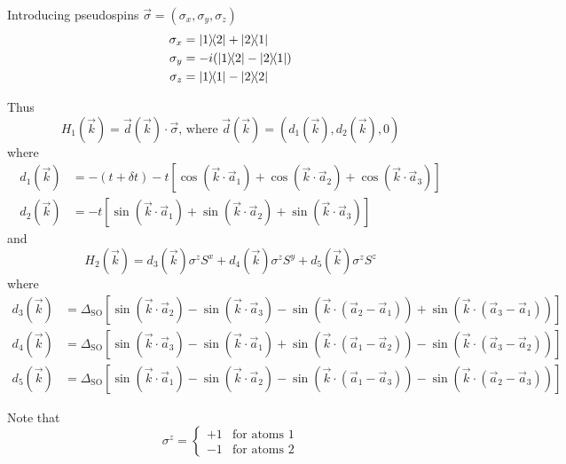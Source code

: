 \documentclass[12pt,a4paper,titlepage]{article}
\newcommand{\trm}[1]{\textrm{#1}} %
\begin{document}
Introducing pseudospins $\vec{\sigma}=(\sigma_{x},\sigma_{y},\sigma_{z})$
\begin{equation}
\begin{aligned}
\sigma_{x}&=\ketbra{1}{2}+\ketbra{2}{1}\\
\sigma_{y}&=-i(\ketbra{1}{2}-\ketbra{2}{1})\\
\sigma_{z}&=\ketbra{1}{1}-\ketbra{2}{2}
\end{aligned}
\end{equation}

Thus
\begin{equation}
H_{1}(\vec{k})=\vec{d}(\vec{k})\cdot\vec{\sigma}{\trm{, where }}\vec{d}(\vec{k})=(d_{1}(\vec{k}),d_{2}(\vec{k}),0)
\end{equation}
where
\begin{equation}
\begin{aligned}
d_{1}(\vec{k})&=-(t+\delta t)-t\left[\cos(\vec{k}\cdot\vec{a}_{1})+\cos(\vec{k}\cdot\vec{a}_{2})+\cos(\vec{k}\cdot\vec{a}_{3})\right]\\
d_{2}(\vec{k})&=-t\left[\sin(\vec{k}\cdot\vec{a}_{1})+\sin(\vec{k}\cdot\vec{a}_{2})+\sin(\vec{k}\cdot\vec{a}_{3})\right]
\end{aligned}
\end{equation}
and
\begin{equation}
H_{2}(\vec{k})=d_{3}(\vec{k})\sigma^{z}S^{x}+d_{4}(\vec{k})\sigma^{z}S^{y}+d_{5}(\vec{k})\sigma^{z}S^{z}
\end{equation}
where
\begin{equation}
\begin{aligned}
d_{3}(\vec{k})&=\Delta_{\trm{SO}}\left[\sin(\vec{k}\cdot\vec{a}_{2})-\sin(\vec{k}\cdot\vec{a}_{3})-\sin(\vec{k}\cdot(\vec{a}_{2}-\vec{a}_{1}))+\sin(\vec{k}\cdot(\vec{a}_{3}-\vec{a}_{1}))\right]\\
d_{4}(\vec{k})&=\Delta_{\trm{SO}}\left[\sin(\vec{k}\cdot\vec{a}_{3})-\sin(\vec{k}\cdot\vec{a}_{1})+\sin(\vec{k}\cdot(\vec{a}_{1}-\vec{a}_{2}))-\sin(\vec{k}\cdot(\vec{a}_{3}-\vec{a}_{2}))\right]\\
d_{5}(\vec{k})&=\Delta_{\trm{SO}}\left[\sin(\vec{k}\cdot\vec{a}_{1})-\sin(\vec{k}\cdot\vec{a}_{2})-\sin(\vec{k}\cdot(\vec{a}_{1}-\vec{a}_{3}))-\sin(\vec{k}\cdot(\vec{a}_{2}-\vec{a}_{3}))\right]
\end{aligned}
\end{equation}

Note that
\begin{equation}
\sigma^{z}=\begin{cases}
+1 & \trm{for atoms 1}\\
-1 & \trm{for atoms 2}
\end{cases}
\end{equation}
\end{document}
